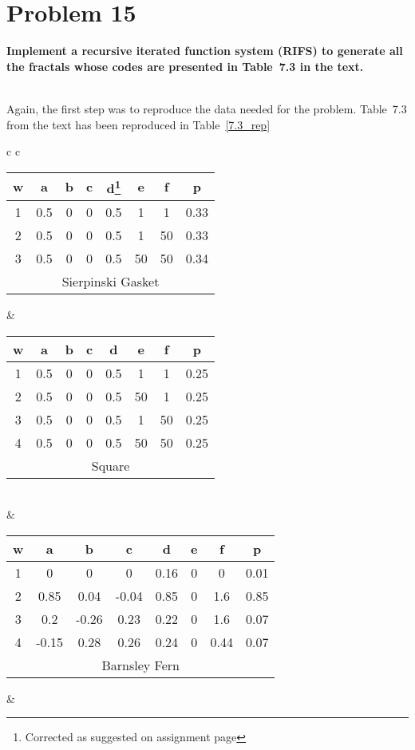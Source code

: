 \section{Problem 15}
\textbf{
Implement a recursive iterated function system (RIFS) to generate all the fractals whose codes are presented in Table~7.3 in the text.
}

\hfill \\

Again, the first step was to reproduce the data needed for the problem. Table~7.3 from the text has been reproduced in Table~\ref{7.3_rep}

\begin{table}
\begin{tabular}{ c c }
	\begin{tabular}{ c c c c c c c c }
	\hline
	w & a & b & c & d\footnote{Corrected as suggested on assignment page} & e & f & p \\
	\hline
	1 & 0.5 & 0 & 0 & 0.5 & 1 & 1 & 0.33 \\
	2 & 0.5 & 0 & 0 & 0.5 & 1 & 50 & 0.33 \\
	3 & 0.5 & 0 & 0 & 0.5 & 50 & 50 & 0.34 \\
	\hline
	\multicolumn{8}{c}{Sierpinski Gasket}
	\end{tabular} &

	\begin{tabular}{ c c c c c c c c }
	\hline
	w & a & b & c & d & e & f & p \\
	\hline
	1 & 0.5 & 0 & 0 & 0.5 & 1 & 1 & 0.25 \\
	2 & 0.5 & 0 & 0 & 0.5 & 50 & 1 & 0.25 \\
	3 & 0.5 & 0 & 0 & 0.5 & 1 & 50 & 0.25 \\
	4 & 0.5 & 0 & 0 & 0.5 & 50 & 50 & 0.25 \\
	\hline
	\multicolumn{8}{c}{Square}
	\end{tabular} \\
	
	\hfill & \hfill \\
	
	\begin{tabular}{ c c c c c c c c }
	\hline
	w & a & b & c & d & e & f & p \\
	\hline
	1 & 0 & 0 & 0 & 0.16 & 0 & 0 & 0.01 \\
	2 & 0.85 & 0.04 & -0.04 & 0.85 & 0 & 1.6 &0.85 \\
	3 & 0.2 & -0.26 & 0.23 & 0.22 & 0 & 1.6 & 0.07 \\
	4 & -0.15 & 0.28 & 0.26 & 0.24 & 0 & 0.44 & 0.07 \\
	\hline
	\multicolumn{8}{c}{Barnsley Fern}
	\end{tabular} &
	

\end{tabular}
\end{table}
